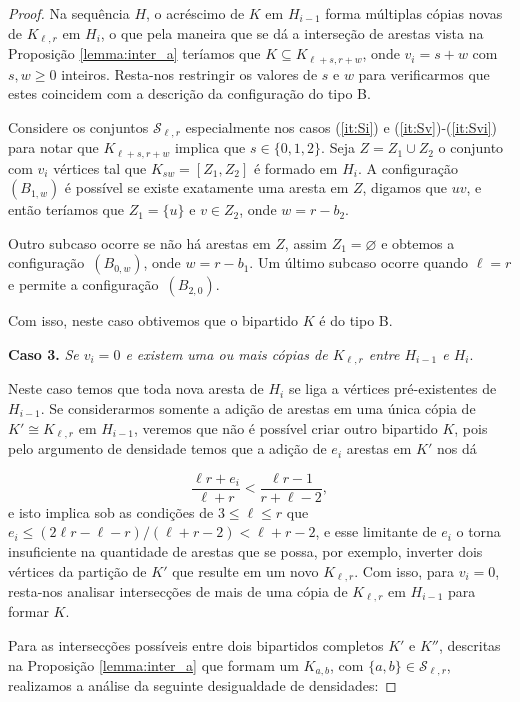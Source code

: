 \documentclass[12pt,a4paper]{book}
\newcommand{\K}{K_{\ell,r}} %
\newcommand{\Slr}{\mathcal{S}_{\ell,r}} %
\let\subset\subseteq
\begin{document}
\begin{proof}
    Na sequência $H$, o acréscimo de $K$ em $H_{i-1}$ forma múltiplas cópias novas de $\K$ em $H_i$, o que pela maneira que se dá a interseção de arestas vista na Proposição \ref{lemma:inter_a} 
    teríamos que 
    $K \subset K_{\ell+s, r+w}$, onde $v_i = s+w$ com $s,w \geq 0$ inteiros. 
    Resta-nos restringir os valores de $s$ e $w$ para verificarmos que estes coincidem com a descrição da configuração do tipo B.

    Considere os conjuntos $\Slr$ especialmente nos casos (\ref{it:Si}) e (\ref{it:Sv})-(\ref{it:Svi}) para notar que $K_{\ell+s, r+w}$ implica que $s \in \{0,1,2\}$.
    Seja $Z=Z_1\cup Z_2$ o conjunto com $v_i$ vértices tal que 
   $K_{sw}=[Z_1,Z_2]$ é formado em $H_i$. 
   A configuração~\hyperlink{HconfigB}{$(B_{1,w})$} é possível 
   se existe exatamente uma aresta em $Z$, digamos que $uv$, e então teríamos que
    $Z_1 = \{u\}$ e $v \in Z_2$, onde $w = r-b_2$.
        
    Outro subcaso ocorre se não há arestas em $Z$, assim $Z_1 =
    \varnothing$ e obtemos a configuração~\hyperlink{HconfigB}{$(B_{0,w})$}, 
    onde $w = r-b_1$.
    Um último subcaso ocorre quando $\ell = r$ e permite a
configuração~\hyperlink{HconfigB}{$(B_{2,0})$}. 
    
    Com isso, neste caso obtivemos que o bipartido $K$ é do tipo B.
   
 \medskip \textbf{Caso 3.} 
	 \emph{Se $v_i = 0$ e existem uma ou mais cópias de $\K$ entre $H_{i-1}$ e $H_i$}. 
	  
	 Neste caso temos que toda nova aresta de $H_i$ se liga a vértices pré-existentes de $H_{i-1}$. 
      Se considerarmos somente a adição de arestas em uma única cópia de $K' \cong \K$ em $H_{i-1}$, veremos que não é possível criar outro bipartido $K$, pois pelo argumento de densidade temos que a adição de $e_i$ arestas em $K'$ nos dá
      
    \[ 
		\frac{\ell r + e_i}{\ell+r} < \frac{\ell r-1}{r+\ell-2},
    \]
	e isto implica sob as condições de $3 \leq \ell \leq r$ que 
	$e_i \leq (2\ell r -\ell-r)/(\ell+r-2) < \ell+r-2$, 
	e esse limitante de $e_i$ o torna insuficiente na quantidade de arestas que se possa, por exemplo, inverter dois vértices da partição de $K'$ que resulte em um novo $\K$.
    Com isso, para $v_i=0$, resta-nos analisar intersecções de mais de uma cópia de $\K$ em $H_{i-1}$ para formar $K$.
    
    Para as intersecções possíveis entre dois bipartidos completos $K'$ e $K''$, descritas na Proposição \ref{lemma:inter_a} que formam um $K_{a,b}$, com $\{a,b\} \in \Slr$, realizamos a  análise da seguinte desigualdade de densidades:


\end{proof}
\end{document}
